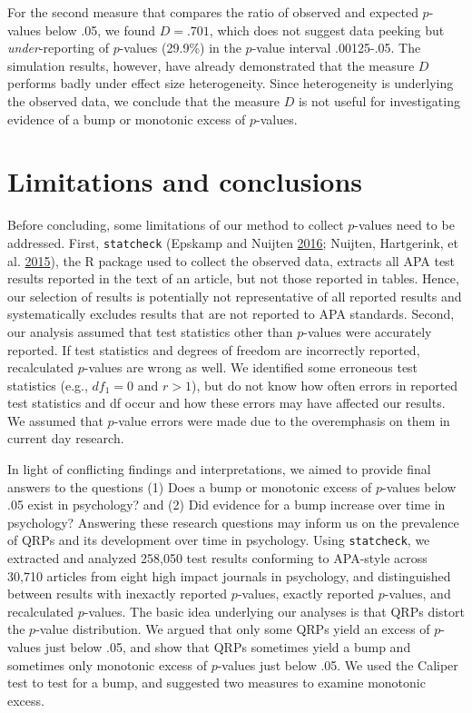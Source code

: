 \documentclass[a5paper]{book}
\begin{document}
For the second measure that compares the ratio of observed and expected
\(p\)-values below .05, we found \(D=.701\), which does not suggest data
peeking but \emph{under}-reporting of \(p\)-values (29.9\%) in the
\(p\)-value interval .00125-.05. The simulation results, however, have
already demonstrated that the measure \(D\) performs badly under effect
size heterogeneity. Since heterogeneity is underlying the observed data,
we conclude that the measure \(D\) is not useful for investigating
evidence of a bump or monotonic excess of \(p\)-values.

\section{Limitations and conclusions}\label{limitations-and-conclusions}

Before concluding, some limitations of our method to collect
\(p\)-values need to be addressed. First, \texttt{statcheck} (Epskamp
and Nuijten \protect\hyperlink{ref-statcheck}{2016}; Nuijten,
Hartgerink, et al.
\protect\hyperlink{ref-doi:10.3758ux2fs13428-015-0664-2}{2015}), the R
package used to collect the observed data, extracts all APA test results
reported in the text of an article, but not those reported in tables.
Hence, our selection of results is potentially not representative of all
reported results and systematically excludes results that are not
reported to APA standards. Second, our analysis assumed that test
statistics other than \(p\)-values were accurately reported. If test
statistics and degrees of freedom are incorrectly reported, recalculated
\(p\)-values are wrong as well. We identified some erroneous test
statistics (e.g., \(df_1=0\) and \(r>1\)), but do not know how often
errors in reported test statistics and df occur and how these errors may
have affected our results. We assumed that \(p\)-value errors were made
due to the overemphasis on them in current day research.

In light of conflicting findings and interpretations, we aimed to
provide final answers to the questions (1) Does a bump or monotonic
excess of \(p\)-values below .05 exist in psychology? and (2) Did
evidence for a bump increase over time in psychology? Answering these
research questions may inform us on the prevalence of QRPs and its
development over time in psychology. Using \texttt{statcheck}, we
extracted and analyzed 258,050 test results conforming to APA-style
across 30,710 articles from eight high impact journals in psychology,
and distinguished between results with inexactly reported \(p\)-values,
exactly reported \(p\)-values, and recalculated \(p\)-values. The basic
idea underlying our analyses is that QRPs distort the \(p\)-value
distribution. We argued that only some QRPs yield an excess of
\(p\)-values just below .05, and show that QRPs sometimes yield a bump
and sometimes only monotonic excess of \(p\)-values just below .05. We
used the Caliper test to test for a bump, and suggested two measures to
examine monotonic excess.
\end{document}
